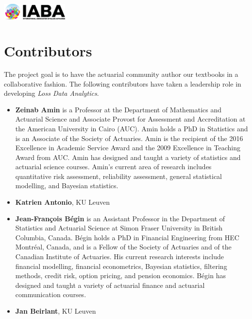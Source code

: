 \documentclass[
]{book}
\begin{document}
\includegraphics[width=0.25\textwidth,height=\textheight]{Figures/IABA.png}

\hypertarget{contributors}{%
\section*{Contributors}\label{contributors}}

The project goal is to have the actuarial community author our textbooks in a collaborative fashion. The following contributors have taken a leadership role in developing \emph{Loss Data Analytics}.

\begin{itemize}
\item
  \textbf{Zeinab Amin} is a Professor at the Department of Mathematics and Actuarial Science and Associate Provost for Assessment and Accreditation at the American University in Cairo (AUC). Amin holds a PhD in Statistics and is an Associate of the Society of Actuaries. Amin is the recipient of the 2016 Excellence in Academic Service Award and the 2009 Excellence in Teaching Award from AUC. Amin has designed and taught a variety of statistics and actuarial science courses. Amin's current area of research includes quantitative risk assessment, reliability assessment, general statistical modelling, and Bayesian statistics.
\item
  \textbf{Katrien Antonio}, KU Leuven
\end{itemize}

\begin{itemize}
\item
  \textbf{Jean-François Bégin} is an Assistant Professor in the Department of Statistics and Actuarial Science at Simon Fraser University in British Columbia, Canada. Bégin holds a PhD in Financial Engineering from HEC Montréal, Canada, and is a Fellow of the Society of Actuaries and of the Canadian Institute of Actuaries. His current research interests include financial modelling, financial econometrics, Bayesian statistics, filtering methods, credit risk, option pricing, and pension economics. Bégin has designed and taught a variety of actuarial finance and actuarial communication courses.
\item
  \textbf{Jan Beirlant}, KU Leuven
\end{itemize}
\end{document}
